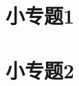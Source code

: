 \documentclass[color=blue]{textbook-cn}%
\begin{document}
\begin{Topic}

\section{小专题1}


\Example{\zhlipsum[1]}

\subsection{}
\subsection{  }



\begin{Exercise}
	\lipsum[2]
\end{Exercise}

\begin{Thinking}
	\lipsum[2]
\end{Thinking}


\begin{Improve}
	\lipsum[2]
\end{Improve}




\makeatletter

\makeatother



\zhlipsum


\section{小专题2}


\Example{\zhlipsum[1]}


\Example{\zhlipsum[2]}

	
\end{Topic}
\end{document}
